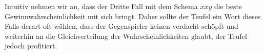 \documentclass[a4paper]{scrartcl}
\def \blattnr {2}
\begin{document}
\begin{enumerate}[label=\bfseries \blattnr.\arabic*]
\begin{enumerate}[label=\alph*)]
                Intuitiv nehmen wir an, dass der Dritte Fall mit dem Schema $xxy$ die beste 
                Gewinnwahrscheinlichkeit mit sich bringt. Daher sollte der Teufel ein Wort dieses
                Falls derart oft wählen, dass der Gegenspieler keinen verdacht schöpft und weiterhin
                an die Gleichverteilung der Wahrscheinlichkeiten glaubt, der Teufel jedoch profitiert.
        \end{enumerate}

\end{enumerate}
\end{document}
